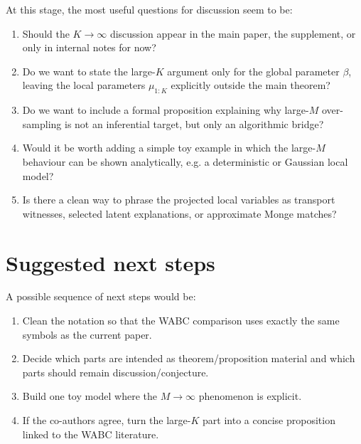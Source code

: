 \documentclass[11pt]{article}
\begin{document}
At this stage, the most useful questions for discussion seem to be:
\begin{enumerate}[label=(\arabic*)]
    \item Should the $K \to \infty$ discussion appear in the main paper, the supplement, or only
    in internal notes for now?
    \item Do we want to state the large-$K$ argument only for the global parameter $\beta$,
    leaving the local parameters $\mu_{1:K}$ explicitly outside the main theorem?
    \item Do we want to include a formal proposition explaining why large-$M$ over-sampling is
    not an inferential target, but only an algorithmic bridge?
    \item Would it be worth adding a simple toy example in which the large-$M$ behaviour can be
    shown analytically, e.g. a deterministic or Gaussian local model?
    \item Is there a clean way to phrase the projected local variables as transport witnesses,
    selected latent explanations, or approximate Monge matches?
\end{enumerate}

\section{Suggested next steps}

A possible sequence of next steps would be:
\begin{enumerate}[label=(\arabic*)]
    \item Clean the notation so that the WABC comparison uses exactly the same symbols as the
    current paper.
    \item Decide which parts are intended as theorem/proposition material and which parts should
    remain discussion/conjecture.
    \item Build one toy model where the $M \to \infty$ phenomenon is explicit.
    \item If the co-authors agree, turn the large-$K$ part into a concise proposition linked to the
    WABC literature.
\end{enumerate}
\end{document}
